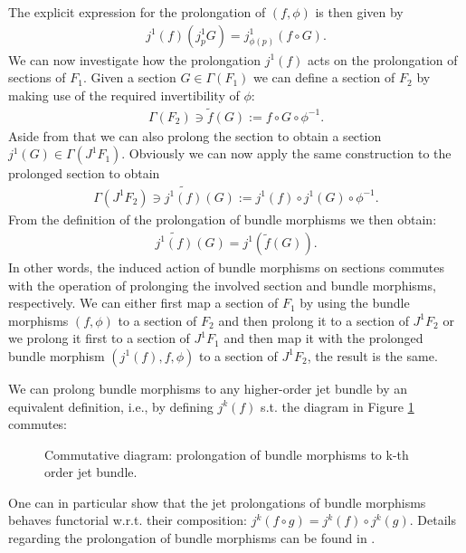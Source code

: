 \documentclass[a4paper,12pt, DIV=14, BCOR=5mm, twoside, headsepline, numbers=noenddot]{scrbook}
\begin{document}
The explicit expression for the prolongation of $(f,\phi)$ is then given by
\begin{align}
    j^1(f)(j^1_pG) = j^1_{\phi(p)}(f\circ G).
\end{align}
We can now investigate how the prolongation $j^1(f)$ acts on the prolongation of sections of $F_1$.
Given a section $G \in \Gamma(F_1)$ we can define a section of $F_2$ by making use of the required invertibility of $\phi$: 
\begin{align}
\Gamma(F_2) \ni \widetilde{f}(G) := f \circ G \circ \phi^{-1}.
\end{align}
Aside from that we can also prolong the section to obtain a section $j^1(G) \in \Gamma(J^1F_1)$. Obviously we can now apply the same construction to the prolonged section to obtain 
\begin{align}
\Gamma(J^1F_2) \ni \widetilde{j^1(f)}(G) := j^1(f) \circ j^1(G) \circ \phi^{-1}.
\end{align}
From the definition of the prolongation of bundle morphisms we then obtain:
\begin{align}
    \widetilde{j^1(f)}(G) = j^1(\widetilde{f}(G)).
\end{align}
In other words, the induced action of bundle morphisms on sections commutes with the operation of prolonging the involved section and bundle morphisms, respectively. We can either first map a section of $F_1$ by using the bundle morphisms $(f,\phi)$ to a section of $F_2$ and then prolong it to a section of $J^1F_2$ or we prolong it first to a section of $J^1F_1$ and then map it with the prolonged bundle morphism $(j^1(f),f,\phi)$ to a section of $J^1F_2$, the result is the same.  

We can prolong bundle morphisms to any higher-order jet bundle by an equivalent definition, i.e., by defining $j^k(f)$ s.t. the diagram in Figure \ref{POrolongK} commutes:
\begin{figure}[hbt!]
\centering
{}
\caption{Commutative diagram: prolongation of bundle morphisms to k-th order jet bundle.} \label{POrolongK}
\end{figure}
One can in particular show that the jet prolongations of bundle morphisms behaves functorial w.r.t. their composition: $j^k(f\circ g) = j^k(f) \circ j^k (g)$. Details regarding the prolongation of bundle morphisms can be found in \cite{saunders_1989}.
\end{document}
